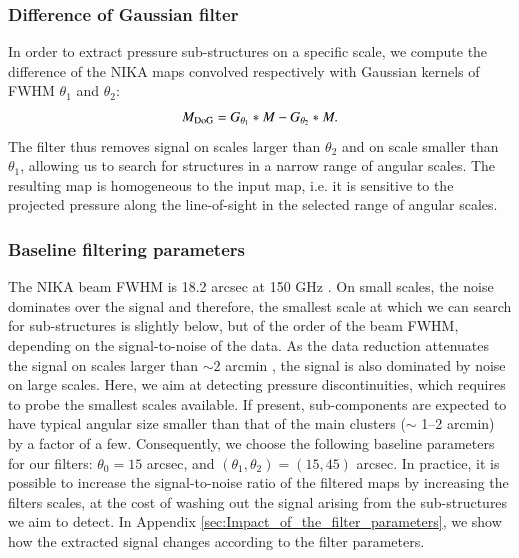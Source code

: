 \documentclass[twocolumn,traditabstract]{aa}
\begin{document}
\subsubsection{Difference of Gaussian filter}
In order to extract pressure sub-structures on a specific scale, we compute the difference of the NIKA maps convolved respectively with Gaussian kernels of FWHM $\theta_1$ and $\theta_2$:
\begin{equation}
	M_{\rm DoG} = G_{\theta_1} \ast M - G_{\theta_2} \ast M.
	\label{eq:DoG_filter}
\end{equation}
The filter thus removes signal on scales larger than $\theta_2$ and on scale smaller than $\theta_1$, allowing us to search for structures in a narrow range of angular scales. The resulting map is homogeneous to the input map, i.e. it is sensitive to the projected pressure along the line-of-sight in the selected range of angular scales.

\subsubsection{Baseline filtering parameters}\label{sec:Baseline_filtering_parameters}
The NIKA beam FWHM is 18.2 arcsec at 150 GHz \citep{Catalano2014}. On small scales, the noise dominates over the signal and therefore, the smallest scale at which we can search for sub-structures is slightly below, but of the order of the beam FWHM, depending on the signal-to-noise of the data. As the data reduction attenuates the signal on scales larger than $\sim 2$ arcmin \citep[see][and section \ref{sec:Systematics_and_noise_properties}]{Adam2015}, the signal is also dominated by noise on large scales. Here, we aim at detecting pressure discontinuities, which requires to probe the smallest scales available. If present, sub-components are expected to have typical angular size smaller than that of the main clusters ($\sim$ 1--2 arcmin) by a factor of a few. Consequently, we choose the following baseline parameters for our filters: $\theta_0 = 15$ arcsec, and $\left(\theta_1, \theta_2\right) = \left(15, 45\right)$ arcsec. In practice, it is possible to increase the signal-to-noise ratio of the filtered maps by increasing the filters scales, at the cost of washing out the signal arising from the sub-structures we aim to detect. In Appendix \ref{sec:Impact_of_the_filter_parameters}, we show how the extracted signal changes according to the filter parameters.


\end{document}
